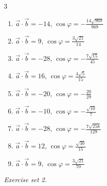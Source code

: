 \begin{multicols}{3}
\begin{enumerate}[label=\arabic*., leftmargin=*, itemsep=1pt]
\item $\vec a\cdot\vec b=-14$, $\cos\varphi=- \frac{14 \sqrt{969}}{969}$
\item $\vec a\cdot\vec b=9$, $\cos\varphi=\frac{3 \sqrt{21}}{14}$
\item $\vec a\cdot\vec b=-28$, $\cos\varphi=- \frac{7 \sqrt{15}}{45}$
\item $\vec a\cdot\vec b=16$, $\cos\varphi=\frac{4 \sqrt{5}}{15}$
\item $\vec a\cdot\vec b=-20$, $\cos\varphi=- \frac{20}{29}$
\item $\vec a\cdot\vec b=-10$, $\cos\varphi=- \frac{\sqrt{10}}{7}$
\item $\vec a\cdot\vec b=-28$, $\cos\varphi=- \frac{7 \sqrt{258}}{129}$
\item $\vec a\cdot\vec b=12$, $\cos\varphi=\frac{\sqrt{30}}{15}$
\item $\vec a\cdot\vec b=9$, $\cos\varphi=\frac{3 \sqrt{21}}{70}$
\end{enumerate}
\end{multicols}
\par\noindent\emph{Exercise set 2.}\nopagebreak
